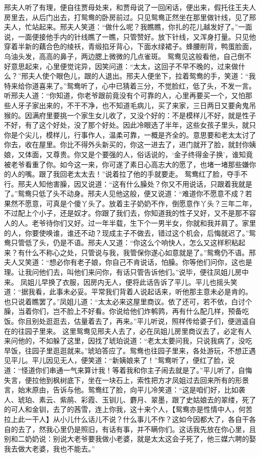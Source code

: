 \documentclass[12pt,oneside]{book}
\begin{document}
邢夫人听了有理，便自往贾母处来，和贾母说了一回闲话，便出来，假托往王夫人房里去，从后门出去，打鸳鸯的卧房前过。只见鸳鸯正然坐在那里做针线，见了邢夫人，忙站起来。邢夫人笑道：“做什么呢？我瞧瞧，你扎的花儿越发好了。”一面说，一面便接他手内的针线瞧了一瞧，只管赞好。放下针线，又浑身打量。只见他穿着半新的藕合色的绫袄，青缎掐牙背心，下面水绿裙子。蜂腰削背，鸭蛋脸面，乌油头发，高高的鼻子，两边腮上微微的几点雀斑。
鸳鸯见这般看他，自己倒不好意思起来，心里便觉诧异，因笑问道：“太太，这回子不早不晚的，过来做什么？”邢夫人使个眼色儿，跟的人退出。邢夫人便坐下，拉着鸳鸯的手，笑道：“我特来给你道喜来了。”鸳鸯听了，心中已猜着三分，不觉脸红，低了头，不发一言。听邢夫人道：“你知道，你老爷跟前竟没有个可靠的人，心里再要买一个，又怕那些人牙子家出来的，不干不净，也不知道毛病儿，买了来家，三日两日又要肏鬼吊猴的。因满府里要挑一个家生女儿收了，又没个好的：不是模样儿不好，就是性子不好，有了这个好处，没了那个好处。因此冷眼选了半年，这些女孩子里头，就只你是个尖儿，模样儿，行事作人，温柔可靠，一概是齐全的。意思要和老太太讨了你去，收在屋里。你比不得外头新买的，你这一进去了，进门就开了脸，就封你姨娘，又体面，又尊贵。你又是个要强的人，俗话说的，‘金子终得金子换’，谁知竟被老爷看重了你。如今这一来，你可遂了素日心高志大的愿了，也堵一堵那些嫌你的人的嘴。跟了我回老太太去！”说着拉了他的手就要走。
鸳鸯红了脸，夺手不行。邢夫人知他害臊，因又说道：“这有什么臊处？你又不用说话，只跟着我就是了。”鸳鸯只低了头不动身。邢夫人见他这般，便又说道：“难道你不愿意不成？若果然不愿意，可真是个傻丫头了。放着主子奶奶不作，倒愿意作丫头？三年二年，不过配上个小子，还是奴才。你跟了我们去，你知道我的性子又好，又不是那不容人的人。老爷待你们又好。过一年半载，生下个一男半女，你就和我并肩了。家里的人，你要使唤谁，谁还不动？现成主子不做去，错过这个机会，后悔就迟了。”鸳鸯只管低了头，仍是不语。邢夫人又道：“你这么个响快人，怎么又这样积粘起来？有什么不称心之处，只管说与我，我管保你遂心如意就是了。”鸳鸯仍不语。邢夫人又笑道：“想必你有老子娘，你自己不肯说话，怕臊。你等他们问你，这也是理。让我问他们去，叫他们来问你，有话只管告诉他们。”说毕，便往凤姐儿房中来。
凤姐儿早换了衣服，因房内无人，便将此话告诉了平儿。平儿也摇头笑道：“据我看，此事未必妥。平常我们背着人说起话来，听他那主意未必是肯的。也只说着瞧罢了。”凤姐儿道：“太太必来这屋里商议。依了还可，若不依，白讨个臊，当着你们，岂不脸上不好看。你说给他们炸鹌鹑，再有什么配几样，预备吃饭。你且别处逛逛去，估量着去了，再来。”平儿听说，照样传给婆子们，便逍遥自在的往园子里来。
这里鸳鸯见邢夫人去了，必在凤姐儿房里商议去了，必定有人来问他的，不如躲了这里，因找了琥珀说道：“老太太要问我，只说我病了，没吃早饭，往园子里逛逛就来。”琥珀答应了。鸳鸯也往园子里来，各处游玩，不想正遇见平儿。平儿因见无人，便笑道：“新姨娘来了！”鸳鸯听了，便红了脸，说道：“怪道你们串通一气来算计我！等着我和你主子闹去就是了。”平儿听了，自悔失言，便拉他到枫树底下，坐在一块石上，索性把方才凤姐过去回来所有的形景言，始末原由，告诉与他。鸳鸯红了脸，向平儿冷笑道：“这是咱们好，比如袭人、琥珀、素云、紫鹃、彩霞、玉钏儿、麝月、翠墨，跟了史姑娘去的翠缕，死了的可人和金钏，去了的茜雪，连上你我，这十来个人，【鸳鸯亦是性情中人，何苦拉上此一干人】从小儿什么话儿不说？什么事儿不作？这如今因都大了，各自干各自的去了，然我心里仍是照旧，有话有事，并不瞒你们。这话我先放在你心里，且别和二奶奶说：别说大老爷要我做小老婆，就是太太这会子死了，他三媒六聘的娶我去做大老婆，我也不能去。”
\end{document}
